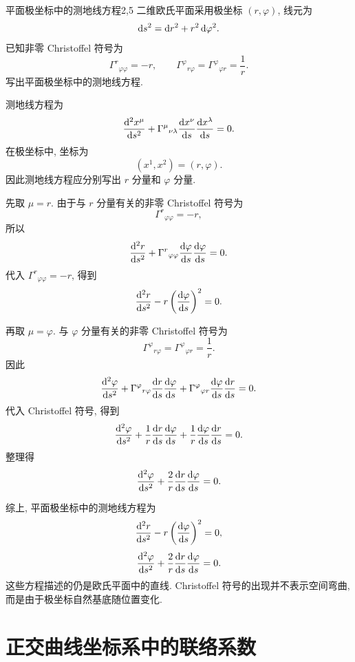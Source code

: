 \begin{example}{平面极坐标中的测地线方程}{2,5}
	二维欧氏平面采用极坐标 $(r,\varphi)$, 线元为
	\[
	\mathop{}\!\mathrm{d} s^{2}
	=
	\mathop{}\!\mathrm{d} r^{2}
	+
	r^{2}\mathop{}\!\mathrm{d}\varphi^{2}.
	\]
	已知非零 Christoffel 符号为
	\[
	\Gamma^{r}{}_{\varphi\varphi}
	=
	-r,
	\qquad
	\Gamma^{\varphi}{}_{r\varphi}
	=
	\Gamma^{\varphi}{}_{\varphi r}
	=
	\frac{1}{r}.
	\]
	写出平面极坐标中的测地线方程. 
	\begin{solution}
		测地线方程为
		\[
		\frac{\mathop{}\!\mathrm{d}^{2}x^{\mu}}{\mathop{}\!\mathrm{d} s^{2}}
		+
		\Gamma^{\mu}{}_{\nu\lambda}
		\frac{\mathop{}\!\mathrm{d} x^{\nu}}{\mathop{}\!\mathrm{d} s}
		\frac{\mathop{}\!\mathrm{d} x^{\lambda}}{\mathop{}\!\mathrm{d} s}
		=
		0.
		\]
		在极坐标中, 坐标为
		\[
		(x^{1},x^{2})=(r,\varphi).
		\]
		因此测地线方程应分别写出 $r$ 分量和 $\varphi$ 分量. 
		
		先取 $\mu=r$. 由于与 $r$ 分量有关的非零 Christoffel 符号为
		\[
		\Gamma^{r}{}_{\varphi\varphi}
		=
		-r,
		\]
		所以
		\[
		\frac{\mathop{}\!\mathrm{d}^{2}r}{\mathop{}\!\mathrm{d} s^{2}}
		+
		\Gamma^{r}{}_{\varphi\varphi}
		\frac{\mathop{}\!\mathrm{d}\varphi}{\mathop{}\!\mathrm{d} s}
		\frac{\mathop{}\!\mathrm{d}\varphi}{\mathop{}\!\mathrm{d} s}
		=
		0.
		\]
		代入 $\Gamma^{r}{}_{\varphi\varphi}=-r$, 得到
		\[
		\frac{\mathop{}\!\mathrm{d}^{2}r}{\mathop{}\!\mathrm{d} s^{2}}
		-
		r\left(
		\frac{\mathop{}\!\mathrm{d}\varphi}{\mathop{}\!\mathrm{d} s}
		\right)^{2}
		=
		0.
		\]
		
		再取 $\mu=\varphi$. 与 $\varphi$ 分量有关的非零 Christoffel 符号为
		\[
		\Gamma^{\varphi}{}_{r\varphi}
		=
		\Gamma^{\varphi}{}_{\varphi r}
		=
		\frac{1}{r}.
		\]
		因此
		\[
		\frac{\dif^{2}\varphi}{\dif s^{2}}
		+
		\Gamma^{\varphi}{}_{r\varphi}
		\frac{\dif r}{\dif s}
		\frac{\dif\varphi}{\dif s}
		+
		\Gamma^{\varphi}{}_{\varphi r}
		\frac{\dif\varphi}{\dif s}
		\frac{\dif r}{\dif s}
		=
		0.
		\]
		代入 Christoffel 符号, 得到
		\[
		\frac{\dif^{2}\varphi}{\dif s^{2}}
		+
		\frac{1}{r}
		\frac{\dif r}{\dif s}
		\frac{\dif\varphi}{\dif s}
		+
		\frac{1}{r}
		\frac{\dif\varphi}{\dif s}
		\frac{\dif r}{\dif s}
		=
		0.
		\]
		整理得
		\[
		\frac{\mathop{}\!\mathrm{d}^{2}\varphi}{\mathop{}\!\mathrm{d} s^{2}}
		+
		\frac{2}{r}
		\frac{\mathop{}\!\mathrm{d} r}{\mathop{}\!\mathrm{d} s}
		\frac{\mathop{}\!\mathrm{d}\varphi}{\mathop{}\!\mathrm{d} s}
		=
		0.
		\]
		
		综上, 平面极坐标中的测地线方程为
		\[
		\frac{\mathop{}\!\mathrm{d}^{2}r}{\mathop{}\!\mathrm{d} s^{2}}
		-
		r\left(
		\frac{\mathop{}\!\mathrm{d}\varphi}{\mathop{}\!\mathrm{d} s}
		\right)^{2}
		=
		0,
		\]
		\[
		\frac{\mathop{}\!\mathrm{d}^{2}\varphi}{\mathop{}\!\mathrm{d} s^{2}}
		+
		\frac{2}{r}
		\frac{\mathop{}\!\mathrm{d} r}{\mathop{}\!\mathrm{d} s}
		\frac{\mathop{}\!\mathrm{d}\varphi}{\mathop{}\!\mathrm{d} s}
		=
		0.
		\]
		这些方程描述的仍是欧氏平面中的直线. Christoffel 符号的出现并不表示空间弯曲, 而是由于极坐标自然基底随位置变化. 
	\end{solution}
\end{example}

\section{正交曲线坐标系中的联络系数}

